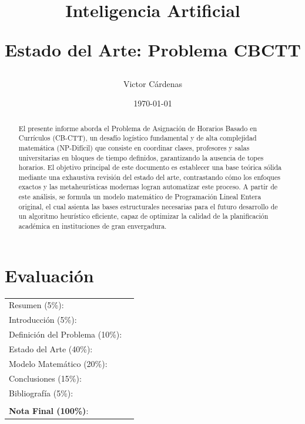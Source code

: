 \documentclass[letter, 10pt]{article}
\begin{document}
\title{Inteligencia Artificial \\ \begin{Large}Estado del Arte: Problema CBCTT\end{Large}}
\author{Victor Cárdenas}
\date{\today}
\maketitle


\section*{Evaluaci\'on}

\begin{tabular}{ll}
Resumen (5\%): & \underline{\hspace{2cm}} \\
Introducci\'on (5\%):  & \underline{\hspace{2cm}} \\
Definici\'on del Problema (10\%):  & \underline{\hspace{2cm}} \\
Estado del Arte (40\%):  & \underline{\hspace{2cm}} \\
Modelo Matem\'atico (20\%): &  \underline{\hspace{2cm}}\\
Conclusiones (15\%): &  \underline{\hspace{2cm}}\\
Bibliograf\'ia (5\%): & \underline{\hspace{2cm}}\\
 &  \\
\textbf{Nota Final (100\%)}:   & \underline{\hspace{2cm}}
\end{tabular}
\vspace{2cm}


\begin{abstract}
El presente informe aborda el Problema de Asignación de Horarios Basado en Currículos (CB-CTT), un desafío logístico fundamental y de alta complejidad matemática (NP-Difícil) que consiste en coordinar clases, profesores y salas universitarias en bloques de tiempo definidos, garantizando la ausencia de topes horarios. El objetivo principal de este documento es establecer una base teórica sólida mediante una exhaustiva revisión del estado del arte, contrastando cómo los enfoques exactos y las metaheurísticas modernas logran automatizar este proceso. A partir de este análisis, se formula un modelo matemático de Programación Lineal Entera original, el cual asienta las bases estructurales necesarias para el futuro desarrollo de un algoritmo heurístico eficiente, capaz de optimizar la calidad de la planificación académica en instituciones de gran envergadura.
\end{abstract}
\end{document}
